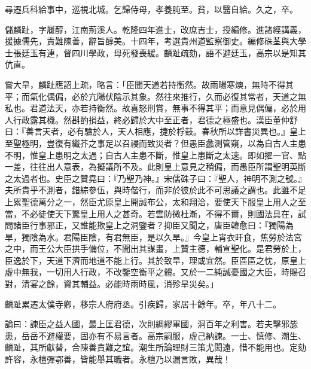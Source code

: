 \begin{pinyinscope}
尋遷兵科給事中，巡視北城。乞歸侍母，孝養肫至。貧，以醫自給。久之，卒。

儲麟趾，字履醇，江南荊溪人。乾隆四年進士，改庶吉士，授編修。進諸經講義，援據儒先，責難陳善，辭旨醇美。十四年，考選貴州道監察御史。編修硃荃與大學士張廷玉有連，督四川學政，母死發喪緩。麟趾疏劾，語不避廷玉，高宗以是知其伉直。

嘗大旱，麟趾應詔上疏，略言：「臣聞天道若持衡然。故雨暘寒燠，無時不得其平；而氣化偶偏，必於亢陽伏陰示其象。然往來推行，久而必復其常者，天道之無私也。君道法天，亦若持衡然。故喜怒刑賞，無事不得其平；而意見偶偏，必於用人行政露其機。然斟酌損益，終必歸於大中至正者，君德之極盛也。漢臣董仲舒曰：『善言天者，必有驗於人，天人相應，捷於桴鼓。春秋所以詳書災異也。』皇上至聖極明，豈復有纖芥之事足以召祲而致災者？但愚臣蠡測管窺，以為自古人主患不明，惟皇上患明之太過；自古人主患不斷，惟皇上患斷之太速。即如擢一官、點一差，往往出人意表，為擬議所不及。此則皇上意見之稍偏，而愚臣所謂聖明英斷之太過者也。史臣之贊堯曰：『乃聖乃神。』宋儒硃子曰：『聖人，神明不測之號。』夫所貴乎不測者，錯綜參伍，與時偕行，而非於彼於此不可思議之謂也。此雖不足上累聖德萬分之一，然臣尤原皇上開誠布公，太和翔洽，要使天下服皇上用人之至當，不必徒使天下驚皇上用人之甚奇。若雲防微杜漸，不得不爾，則國法具在，試問諸臣行事邪正，又誰能欺皇上之洞鑒者？抑臣又聞之，唐臣韓愈曰：『獨陽為旱，獨陰為水。君陽臣陰，有君無臣，是以久旱。』今皇上宵衣旰食，焦勞於法宮之中，而王公大臣拱手備位，不聞出其謀畫，上贊主德，輔宣聖化。是君勞於上，臣逸於下，天道下濟而地道不能上行。其於致旱，理或宜然。臣區區之忱，原皇上虛中無我，一切用人行政，不改鑒空衡平之體。又於一二純誠憂國之大臣，時賜召對，清宴之餘，資其輔益。必能時雨時風，消殄旱災矣。」

麟趾累遷太僕寺卿，移宗人府府丞。引疾歸，家居十餘年。卒，年八十二。

論曰：諫臣之益人國，最上匡君德，次則綢繆軍國，洞百年之利害。若夫擊邪毖患，岳岳不避權要，固亦有不易言者。高宗嗣服，虛己納諫。一士、慎修、潮生、麟趾，其所獻替，合陳善責難之誼。潮生所論理財三策尤閎遠，惜不能用也。定劾許容，永檀彈鄂善，皆能舉其職者。永檀乃以漏言敗，異哉！


\end{pinyinscope}